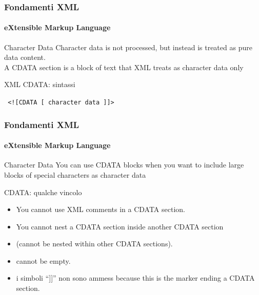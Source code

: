 \begin{frame}
    \frametitle{Fondamenti XML}
    \framesubtitle{eXtensible Markup Language}
    \addtocounter{nframe}{1}

	\begin{block}{Character Data}
		Character data is not processed, but instead is treated as pure data content.
		\\A CDATA section is a block of text that XML treats as character data only
	\end{block}

	\begin{block}{XML CDATA: sintassi}
		\begin{center}
			\texttt{
				 <![CDATA [
					 character data
					 ]]>
			}
		\end{center}
	\end{block}

\end{frame}







\begin{frame}
    \frametitle{Fondamenti XML}
    \framesubtitle{eXtensible Markup Language}
    \addtocounter{nframe}{1}

	\begin{block}{Character Data}
		You can use CDATA blocks when you want to include large blocks of special
		characters as character data
	\end{block}

	\begin{block}{CDATA: qualche vincolo}
		\begin{itemize}
			\item You cannot use XML comments in a CDATA section.
			\item You cannot nest a CDATA section inside another CDATA section
			\item (cannot be nested within other CDATA sections).
			\item cannot be empty.
			\item i simboli ``]]'' non sono ammess because this is the marker ending a CDATA section.
		\end{itemize}
	\end{block}

\end{frame}

